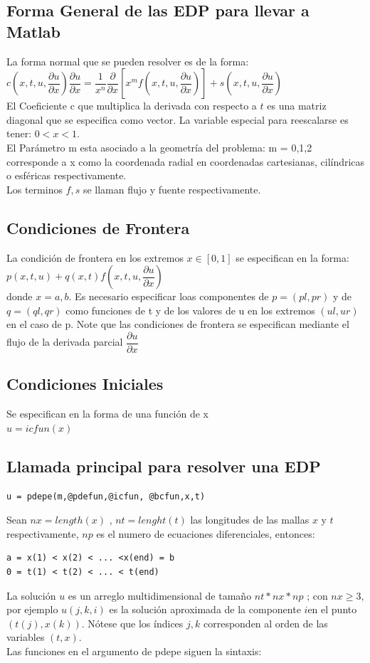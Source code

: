 \documentclass[10pt,a4paper]{article}
\begin{document}
\subsection{Forma General de las EDP para llevar a Matlab} 
La forma normal que se pueden resolver es de la forma:\\
$c (x,t,u, \dfrac{\partial u}{\partial x}) \dfrac{\partial u}{\partial x} = \dfrac{1}{x^n} \dfrac{\partial}{\partial x} [x^m f(x,t,u,\dfrac{\partial u}{\partial x})] + s(x,t,u, \dfrac{\partial u}{\partial x})$\\
El Coeficiente c que multiplica la derivada con respecto a $t$ es una matriz diagonal que se especifica como vector. La variable especial para 	reescalarse es tener: $0 < x < 1$.\\
El Parámetro m esta asociado a la geometría del problema: m = 0,1,2 corresponde a x como la coordenada radial en coordenadas cartesianas, cilíndricas o esféricas respectivamente. \\
Los terminos $f,s$ se llaman flujo y fuente respectivamente.
\subsection{Condiciones de Frontera}
La condición de frontera en los extremos $x \in [0,1]$ se especifican en la forma:\\
$p(x,t,u) + q(x,t) f(x,t,u,\dfrac{\partial u}{\partial x})$\\
donde $x= a,b$. Es necesario especificar loas componentes de $p = (pl, pr)$ y de $q = (ql,qr)$ como funciones de t y de los valores de u en los extremos $(ul,ur)$ en el caso de p. Note que las condiciones de frontera se especifican mediante el flujo de la derivada parcial $\dfrac{\partial u}{\partial x}$
\subsection{Condiciones Iniciales}
Se especifican en la forma de una función de x\\
$u = icfun(x)$
\subsection{Llamada principal para resolver una EDP}
\begin{verbatim}
u = pdepe(m,@pdefun,@icfun, @bcfun,x,t)
\end{verbatim}
Sean $nx = length(x)$ , $nt = lenght(t)$ las longitudes de las mallas $x$ y $t$ respectivamente, $np$ es el numero de ecuaciones diferenciales, entonces:
\begin{verbatim}
a = x(1) < x(2) < ... <x(end) = b
0 = t(1) < t(2) < ... < t(end)
\end{verbatim}
La solución $u$ es un arreglo multidimensional de tamaño $nt * nx * np$ ; con $nx \geq 3$, por ejemplo $u(j,k,i)$ es la solución aproximada de la componente $i$en el punto $(t(j),x(k))$.
Nótese que los índices $j,k$ corresponden al orden de las variables $(t,x)$.\\
Las funciones en el argumento de pdepe siguen la sintaxis:
\end{document}
